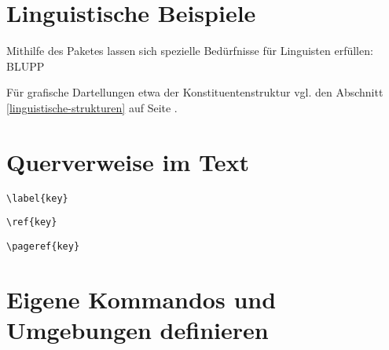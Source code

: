 \section{Linguistische Beispiele}
\label{linguistische-beispiele}

Mithilfe des Paketes  lassen sich spezielle Bedürfnisse für Linguisten erfüllen: BLUPP

Für grafische Dartellungen etwa der Konstituentenstruktur vgl. den Abschnitt 
\ref{linguistische-strukturen} auf Seite \pageref{linguistische-strukturen}.

\section{Querverweise im Text}


\lstinline/\label{key}/

\lstinline/\ref{key}/

\lstinline/\pageref{key}/


\section{Eigene Kommandos und Umgebungen definieren}
\label{makros}


